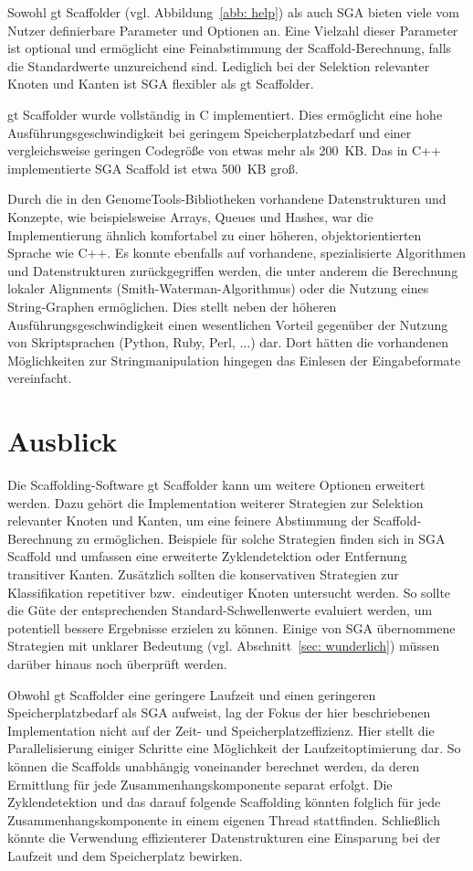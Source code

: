 \documentclass[a4paper,11pt,parskip,abstract=on]{scrartcl}
\begin{document}
Sowohl gt Scaffolder (vgl. Abbildung~\ref{abb: help}) als auch SGA
bieten viele vom Nutzer definierbare Parameter und Optionen an. Eine
Vielzahl dieser Parameter ist optional und ermöglicht eine
Feinabstimmung der Scaffold-Berechnung, falls die Standardwerte
unzureichend sind. Lediglich bei der Selektion relevanter Knoten und
Kanten ist SGA flexibler als gt Scaffolder.

gt Scaffolder wurde vollständig in C implementiert. Dies ermöglicht eine hohe
Ausführungsgeschwindigkeit bei geringem Speicherplatzbedarf und einer
vergleichsweise geringen Codegröße von etwas mehr als \SI{200}{KB}. Das in C++
implementierte SGA Scaffold ist etwa \SI{500}{KB} groß.

Durch die in den GenomeTools-Bibliotheken vorhandene Datenstrukturen und
Konzepte, wie beispielsweise Arrays, Queues und Hashes, war die Implementierung
ähnlich komfortabel zu einer höheren, objektorientierten Sprache wie C++. Es
konnte ebenfalls auf vorhandene, spezialisierte Algorithmen und
Datenstrukturen zurückgegriffen werden, die unter anderem die Berechnung
lokaler Alignments (Smith-Waterman-Algorithmus) oder die Nutzung eines
String-Graphen ermöglichen. Dies stellt neben der höheren
Ausführungsgeschwindigkeit einen wesentlichen Vorteil gegenüber der Nutzung
von Skriptsprachen (Python, Ruby, Perl, $\ldots$) dar. Dort hätten die
vorhandenen Möglichkeiten zur Stringmanipulation hingegen das Einlesen der
Eingabeformate vereinfacht.

\section{Ausblick}
\label{sec: Ausblick}

Die Scaffolding-Software gt Scaffolder kann um weitere Optionen
erweitert werden. Dazu gehört die Implementation weiterer Strategien
zur Selektion relevanter Knoten und Kanten, um eine feinere Abstimmung
der Scaffold-Berechnung zu ermöglichen. Beispiele für solche Strategien
finden sich in SGA Scaffold und umfassen eine erweiterte
Zyklendetektion oder Entfernung transitiver Kanten.
Zusätzlich sollten die konservativen Strategien zur Klassifikation
repetitiver bzw.\ eindeutiger Knoten untersucht werden. So sollte die Güte
der entsprechenden Standard-Schwellenwerte evaluiert werden, um potentiell
bessere Ergebnisse erzielen zu können. Einige von SGA übernommene
Strategien mit unklarer Bedeutung (vgl. Abschnitt~\ref{sec: wunderlich})
müssen darüber hinaus noch überprüft werden.

Obwohl gt Scaffolder eine geringere Laufzeit und einen geringeren
Speicherplatzbedarf als SGA aufweist, lag der Fokus der hier
beschriebenen Implementation nicht auf der Zeit- und
Speicherplatzeffizienz. Hier stellt die Parallelisierung einiger
Schritte eine Möglichkeit der Laufzeitoptimierung dar. So können die
Scaffolds unabhängig voneinander berechnet werden, da deren Ermittlung
für jede Zusammenhangskomponente separat erfolgt. Die Zyklendetektion
und das darauf folgende Scaffolding könnten folglich für jede
Zusammenhangskomponente in einem eigenen Thread
stattfinden. Schließlich könnte die Verwendung effizienterer
Datenstrukturen eine Einsparung bei der Laufzeit und dem Speicherplatz
bewirken.
\end{document}
